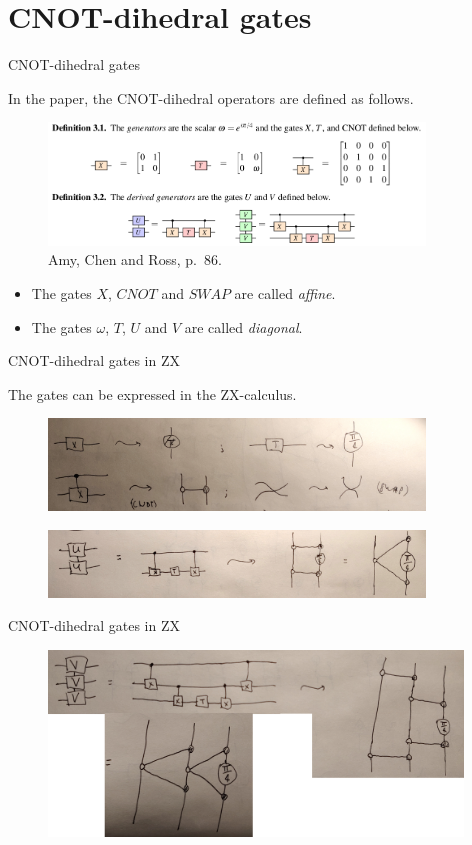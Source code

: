 \documentclass{beamer}
\theoremstyle{definition}
\begin{document}
\section{CNOT-dihedral gates}

\begin{frame}{CNOT-dihedral gates}

In the paper, the CNOT-dihedral operators are defined as follows.
\begin{figure}
\includegraphics[width=10cm]{gates}
\centering
\caption{Amy, Chen and Ross, p.~86.}
\end{figure}
\begin{itemize}
\item The gates $X$, $CNOT$ and $SWAP$ are called {\em affine}.
\item The gates $\omega$, $T$, $U$ and $V$ are called {\em diagonal}.
\end{itemize}
\end{frame}

\begin{frame}{CNOT-dihedral gates in ZX}

The gates can be expressed in the ZX-calculus.
\begin{figure}
\includegraphics[width=10cm]{gates-in-ZX}
\centering
\end{figure}
\begin{figure}
\includegraphics[width=10cm]{U-in-ZX}
\centering
\end{figure}
\end{frame}

\begin{frame}{CNOT-dihedral gates in ZX}
\begin{figure}
\includegraphics[width=11cm]{V-in-ZX}
\centering
\end{figure}
\end{frame}
\end{document}
